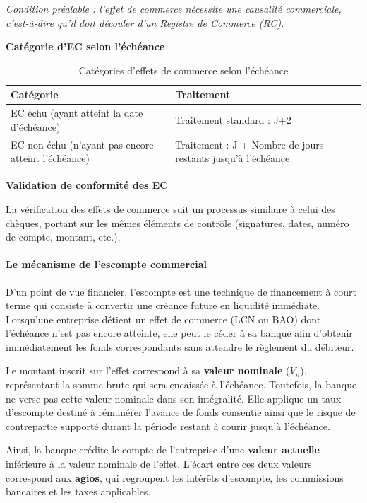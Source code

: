 \textit{Condition préalable : l'effet de commerce nécessite une causalité commerciale, c'est-à-dire qu'il doit découler d'un Registre de Commerce (RC).}

\medskip\textbf{Catégorie d'EC selon l'échéance}

\begin{table}[h!]
\centering
\begin{tabularx}{\textwidth}{X X}
\toprule
Catégorie & Traitement \\
\midrule
EC échu (ayant atteint la date d'échéance) & Traitement standard : J+2 \\
EC non échu (n'ayant pas encore atteint l'échéance) & Traitement : J + Nombre de jours restants jusqu'à l'échéance \\
\bottomrule
\end{tabularx}
\caption{Catégories d'effets de commerce selon l'échéance}
\end{table}

\medskip\textbf{Validation de conformité des EC}

La vérification des effets de commerce suit un processus similaire à celui des chèques, portant sur les mêmes éléments de contrôle (signatures, dates, numéro de compte, montant, etc.).

\paragraph{Le mécanisme de l'escompte commercial}

D'un point de vue financier, l'escompte est une technique de financement à court terme qui consiste à convertir une créance future en liquidité immédiate. Lorsqu'une entreprise détient un effet de commerce (LCN ou BAO) dont l'échéance n'est pas encore atteinte, elle peut le céder à sa banque afin d'obtenir immédiatement les fonds correspondants sans attendre le règlement du débiteur.

Le montant inscrit sur l'effet correspond à sa \textbf{valeur nominale} ($V_n$), représentant la somme brute qui sera encaissée à l'échéance. Toutefois, la banque ne verse pas cette valeur nominale dans son intégralité. Elle applique un taux d'escompte destiné à rémunérer l'avance de fonds consentie ainsi que le risque de contrepartie supporté durant la période restant à courir jusqu'à l'échéance.

Ainsi, la banque crédite le compte de l'entreprise d'une \textbf{valeur actuelle} inférieure à la valeur nominale de l'effet. L'écart entre ces deux valeurs correspond aux \textbf{agios}, qui regroupent les intérêts d'escompte, les commissions bancaires et les taxes applicables.

